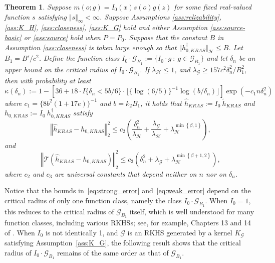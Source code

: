 \documentclass[twoside,11pt]{article}
\newtheorem{theorem}{Theorem}
\newcommand{\mc}{\mathcal}
\begin{document}
\begin{theorem}
Suppose  $m(o;g) = I_0(x)s(o) g(z)$ for some fixed real-valued function $s$ satisfying $\Vert s \Vert_{\infty} < \infty$. Suppose Assumptions \ref{ass:relizability}, \ref{ass:K_H}, \ref{ass:closeness}, \ref{ass:K_G} hold and either Assumption \ref{ass:source-basic} or \ref{ass:source} hold when $P=P_0$. Suppose that the constant $B$ in Assumption \ref{ass:closeness} is taken large enough so that $\big\Vert h_{0,KRAS}^\dag\big\Vert_{\mc{H}}\le B$. Let $B_1=B'/c^2$. Define the function class $ 
I_0\cdot\mc{G}_{B_1}:=\{I_0\cdot g\: :\: g\in\mc{G}_{B_1}\}$ 
    and let $\delta_n$ be an upper bound on the critical radius of $I_0\cdot\mc{G}_{B_1}$. If $\lambda_{\mc{H}}\le 1$, and $\lambda_\mc{G}\ge157c^2\delta_n^2/B_1^2$, then with probability at least $\kappa(\delta_n) :=1-[36+18\cdot I\{\delta_n < 5b/6 \}\cdot\lfloor\{\log(6/5)\}^{-1}\log(b/\delta_n)\rfloor]\exp(-c_1n\delta_n^2)$ 
    where $c_1=\{8b^2(1+17e)\}^{-1}$ and  $b=k_2B_1$,  
    it holds that $\hat{h}_{KRAS} := I_0\:\tilde{h}_{KRAS}$ and $h_{0,KRAS}:=I_0\:h_{0,KRAS}^\dag$ satisfy
  \begin{equation}
      \left\Vert \hat {h}_{KRAS}-h_{0,KRAS}\right\Vert_2^2\le c_2\left(\frac{\delta_n^2}{\lambda_{\mc{H}}}+\frac{\lambda_{\mc{G}}}{\lambda_{\mc{H}}}+\lambda_{\mc{H}}^{\min\left\{\beta,1\right\}}\right),\label{eq:strong_error}
  \end{equation}
    and
    \begin{equation}
         \left\Vert\mc{T} \left(\hat {h}_{KRAS}-h_{0,KRAS}\right)\right\Vert_2^2\le c_3\left(\delta_n^2+\lambda_{\mc{G}}+\lambda_{\mc{H}}^{\min\left\{\beta+1,2\right\}}\right),\label{eq:weak_error}
    \end{equation}
    where $c_2$ and $c_3$ are universal constants that depend neither on $n$ nor on $\delta_n$. \label{theo:conv}
\end{theorem}

Notice that the bounds in~\eqref{eq:strong_error} and~\eqref{eq:weak_error} depend on the critical radius of only one function class, namely the class $I_0\cdot\mc{G}_{B_1}$. When $I_0=1$, this reduces to the critical radius of $\mc{G}_{B_1}$ itself, which is well understood for many function classes, including various RKHSs; see, for example, Chapters 13 and 14 of \cite{wainwright2019high}. When $I_0$ is not identically 1, and $\mc{G}$ is an RKHS generated by a kernel $K_{\mc{G}}$ satisfying Assumption~\ref{ass:K_G}, the following result shows that the critical radius of $I_0 \cdot \mc{G}_{B_1}$ remains of the same order as that of $\mc{G}_{B_1}$.
\end{document}
